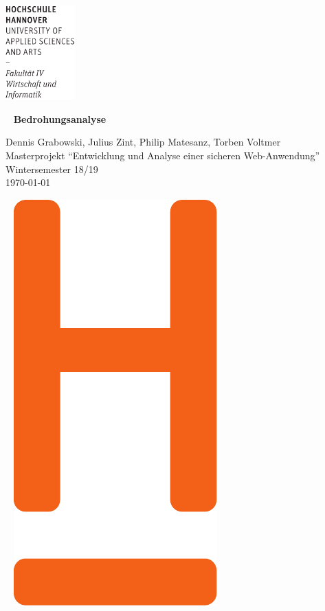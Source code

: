\documentclass[12pt,DIV14,BCOR10mm,a4paper,twoside,parskip=half-,headsepline,headinclude,english,ngerman,bibliography=totocnumbered]{scrreprt}
\begin{document}
  \thispagestyle{empty} %
\includegraphics[width=0.2\textwidth]{Wortmarke_WI_schwarz}

   {  ~ \sffamily
  \vfill
  {\Huge\bfseries Bedrohungsanalyse}
  \bigskip

  {\Large
  Dennis Grabowski, Julius Zint, Philip Matesanz, Torben Voltmer \\[2ex]
  Masterprojekt \enquote{Entwicklung und Analyse einer sicheren Web-Anwendung} \\
  Wintersemester 18/19
 \\[5ex]
   \today }
}
 \vfill

  ~ \hfill
  \includegraphics[height=0.3\paperheight]{H_WI_Pantone1665}

\vspace*{-3cm}

\tableofcontents  %

\printbibliography

\printacronyms[title=Abkürzungsverzeichnis,toctitle=Abkürzungsverzeichnis]
\printglossary[type=main]

\listoffigures      %

\end{document}
